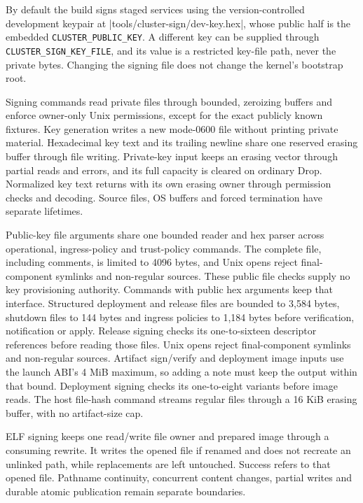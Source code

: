 By default the build signs staged services using the
version-controlled development keypair at
\repofile|tools/cluster-sign/dev-key.hex|, whose public half is the embedded
\texttt{CLUSTER\_PUBLIC\_KEY}. A different key can be supplied through
\texttt{CLUSTER\_SIGN\_KEY\_FILE}, and its value is a restricted key-file path,
never the private bytes. Changing the signing file does not change the
kernel's bootstrap root.

Signing commands read private files through bounded,
zeroizing buffers and enforce owner-only Unix permissions, except for the
exact publicly known fixtures. Key generation writes a new mode-0600 file
without printing private material. Hexadecimal key text and its trailing newline
share one reserved erasing buffer through file writing. Private-key input
keeps an erasing vector through partial reads and errors, and its full capacity
is cleared on ordinary Drop. Normalized key text returns with its own erasing
owner through permission checks and decoding. Source files, OS buffers and
forced termination have separate lifetimes.

Public-key file arguments share one bounded reader and hex parser across
operational, ingress-policy and trust-policy commands. The complete file,
including comments, is limited to 4096 bytes, and Unix opens reject final-component
symlinks and non-regular sources. These public file checks supply no key
provisioning authority. Commands with public hex arguments keep that interface.
Structured deployment and release files are bounded to 3,584 bytes, shutdown
files to 144 bytes and ingress policies to 1,184 bytes before verification,
notification or apply. Release signing checks its one-to-sixteen descriptor
references before reading those files. Unix opens reject final-component
symlinks and non-regular sources. Artifact sign/verify and deployment image
inputs use the launch ABI's 4 MiB maximum, so adding a note must keep the output
within that bound. Deployment signing checks its one-to-eight variants before
image reads. The host file-hash command streams regular files through a 16 KiB
erasing buffer, with no artifact-size cap.

ELF signing keeps one read/write
file owner and prepared image through a consuming rewrite. It writes the opened
file if renamed and does not recreate an unlinked path, while replacements are left
untouched. Success refers to that opened file. Pathname continuity, concurrent
content changes, partial writes and durable atomic publication remain separate
boundaries.

